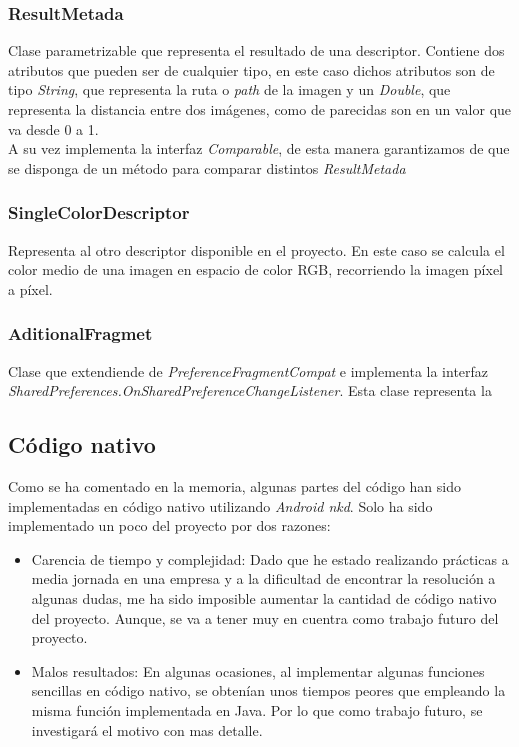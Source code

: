 \subsubsection{ResultMetada}

Clase parametrizable que representa el resultado de una descriptor. Contiene dos atributos que pueden ser de cualquier tipo, en este caso dichos atributos son de tipo \textit{String}, que representa la ruta o \textit{path} de la imagen y un \textit{Double}, que representa la distancia entre dos imágenes, como de parecidas son en un valor que va desde 0 a 1.\\

A su vez implementa la interfaz \textit{Comparable}, de esta manera garantizamos de que se disponga de un método para comparar distintos \textit{ResultMetada}

\subsubsection{SingleColorDescriptor}

Representa al otro descriptor disponible en el proyecto. En este caso se calcula el color medio de una imagen en espacio de color RGB, recorriendo la imagen píxel a píxel.

\subsubsection{AditionalFragmet}

Clase que extendiende de \textit{PreferenceFragmentCompat} e implementa la interfaz \textit{SharedPreferences.OnSharedPreferenceChangeListener}. Esta clase representa la

\subsection{Código nativo}

Como se ha comentado en la memoria, algunas partes del código han sido implementadas en código nativo utilizando \textit{Android nkd}. Solo ha sido implementado un poco del proyecto por dos razones:

\begin{itemize}
\item Carencia de tiempo y complejidad: Dado que he estado realizando prácticas a media jornada en una empresa y a la dificultad de encontrar la resolución a algunas dudas, me ha sido imposible aumentar la cantidad de código nativo del proyecto. Aunque, se va a tener muy en cuentra como trabajo futuro del proyecto.

\item Malos resultados: En algunas ocasiones, al implementar algunas funciones sencillas en código nativo, se obtenían unos tiempos peores que empleando la misma función implementada en Java. Por lo que como trabajo futuro, se investigará el motivo con mas detalle. 

\end{itemize} 
